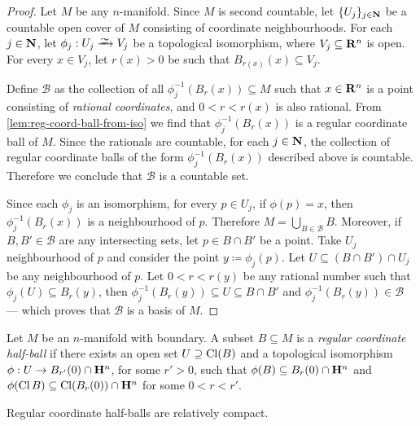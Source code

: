\begin{proof}
Let \(M\) be any \(n\)-manifold. Since \(M\) is second countable, let
\(\{U_{j}\}_{j \in \mathbf{N}}\) be a countable open cover of \(M\) consisting of
coordinate neighbourhoods. For each \(j \in \mathbf{N}\), let \(\phi_j: U_j \isoto V_j\)
be a topological isomorphism, where \(V_j \subseteq \mathbf{R}^n\) is open. For every
\(x \in V_j\), let \(r(x) > 0\) be such that \(B_{r(x)}(x) \subseteq V_j\).

Define \(\mathcal{B}\) as the collection of all \(\phi_j^{-1}(B_{r}(x))
\subseteq M\) such that \(x \in \mathbf{R}^n\) is a point consisting of \emph{rational
  coordinates}, and \(0 < r < r(x)\) is also rational. From
\cref{lem:reg-coord-ball-from-iso} we find that \(\phi_j^{-1}(B_r(x))\) is a
regular coordinate ball of \(M\). Since the rationals are countable, for each
\(j \in \mathbf{N}\), the collection of regular coordinate balls of the form
\(\phi_j^{-1}(B_r(x))\) described above is countable. Therefore we conclude that
\(\mathcal{B}\) is a countable set.

Since each \(\phi_j\) is an isomorphism, for every \(p \in U_j\), if
\(\phi(p) = x\), then \(\phi_j^{-1}(B_r(x))\) is a neighbourhood of
\(p\). Therefore \(M = \bigcup_{B \in \mathcal{B}} B\). Moreover, if
\(B, B' \in \mathcal{B}\) are any intersecting sets, let \(p \in B \cap B'\) be
a point. Take \(U_j\) neighbourhood of \(p\) and consider the point
\(y \coloneq \phi_j(p)\). Let \(U \subseteq (B \cap B') \cap U_j\) be any
neighbourhood of \(p\). Let \(0 < r < r(y)\) be any rational number such that
\(\phi_j(U) \subseteq B_r(y)\), then
\(\phi_j^{-1}(B_r(y)) \subseteq U \subseteq B \cap B'\) and
\(\phi_j^{-1}(B_r(y)) \in \mathcal{B}\) --- which proves that \(\mathcal{B}\) is
a basis of \(M\).
\end{proof}

\begin{definition}
\label{def:reg-coord-half-ball}
Let \(M\) be an \(n\)-manifold with boundary. A subset \(B \subseteq M\) is a
\emph{regular coordinate half-ball} if there exists an open set
\(U \supseteq \operatorname{Cl}(B)\) and a topological isomorphism
\(\phi: U \to B_{r'}(0) \cap \mathbf{H}^n\), for some \(r' > 0\), such that
\(\phi(B) \subseteq B_r(0) \cap \mathbf{H}^n\) and
\(\phi(\operatorname{Cl} B) \subseteq \operatorname{Cl}(B_r(0)) \cap \mathbf{H}^n\) for some \(0 < r < r'\).
\end{definition}

\begin{corollary}
\label{cor:reg-coord-half-balls-are-rel-cpct}
Regular coordinate half-balls are relatively compact.
\end{corollary}

